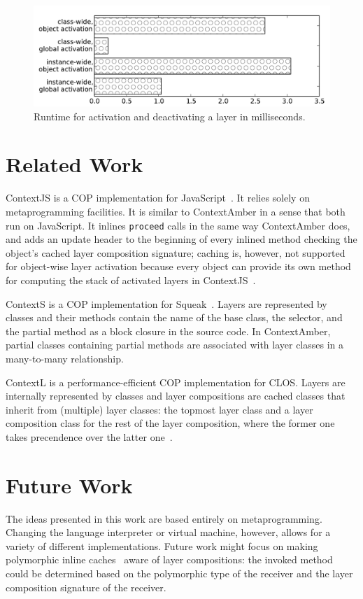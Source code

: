 \documentclass{sig-alternate}
\begin{document}
\begin{figure}[t]
    \includegraphics[width=\columnwidth]{activation_ms.pdf}
    \caption{Runtime for activation and deactivating a layer in milliseconds.}
    \label{fig:activation}
\end{figure}

\section{Related Work}
ContextJS is a COP implementation for JavaScript~\cite{Lincke:2011:OIC:1998661.1998804}. It relies solely on metaprogramming facilities. It is similar to ContextAmber in a sense that both run on JavaScript. It inlines \texttt{proceed} calls in the same way ContextAmber does, and adds an update header to the beginning of every inlined method checking the object's cached layer composition signature; caching is, however, not supported for object-wise layer activation because every object can provide its own method for computing the stack of activated layers in ContextJS~\cite{Krahn:2012:ELA:2223947.2223971}.

ContextS is a COP implementation for Squeak~\cite{Hirschfeld:2007:ICP:1462618.1462629}. Layers are represented by classes and their methods contain the name of the base class, the selector, and the partial method as a block closure in the source code. In ContextAmber, partial classes containing partial methods are associated with layer classes in a many-to-many relationship.

ContextL is a performance-efficient COP implementation for CLOS. Layers are internally represented by classes and layer compositions are cached classes that inherit from (multiple) layer classes: the topmost layer class and a layer composition class for the rest of the layer composition, where the former one takes precendence over the latter one~\cite{Costanza:2006:ELA:2111746.2111753}.

\section{Future Work}
The ideas presented in this work are based entirely on metaprogramming. Changing the language interpreter or virtual machine, however, allows for a variety of different implementations. Future work might focus on making polymorphic inline caches~\cite{Holzle:1991:ODO:646149.679193} aware of layer compositions: the invoked method could be determined based on the polymorphic type of the receiver and the layer composition signature of the receiver.
\end{document}
